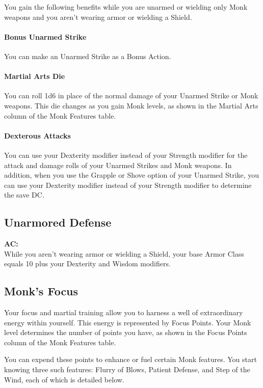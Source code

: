 \documentclass[letterpaper,openany,oneside,twocolumn]{book}
\begin{document}
You gain the following benefits while you are unarmed or wielding only Monk weapons and you aren't wearing armor or wielding a Shield.

\paragraph*{Bonus Unarmed Strike} You can make an Unarmed Strike as a Bonus Action.

\paragraph*{Martial Arts Die} You can roll 1d6 in place of the normal damage of your Unarmed Strike or Monk weapons. This die changes as you gain Monk levels, as shown in the Martial Arts column of the Monk Features table.

\paragraph*{Dexterous Attacks} You can use your Dexterity modifier instead of your Strength modifier for the attack and damage rolls of your Unarmed Strikes and Monk weapons. In addition, when you use the Grapple or Shove option of your Unarmed Strike, you can use your Dexterity modifier instead of your Strength modifier to determine the save DC.
\subsection*{Unarmored Defense}
\textbf{AC: }\\
While you aren't wearing armor or wielding a Shield, your base Armor Class equals 10 plus your Dexterity and Wisdom modifiers.
\subsection*{Monk's Focus}
Your focus and martial training allow you to harness a well of extraordinary energy within yourself. This energy is represented by Focus Points. Your Monk level determines the number of points you have, as shown in the Focus Points column of the Monk Features table.

You can expend these points to enhance or fuel certain Monk features. You start knowing three such features: Flurry of Blows, Patient Defense, and Step of the Wind, each of which is detailed below.
\end{document}
